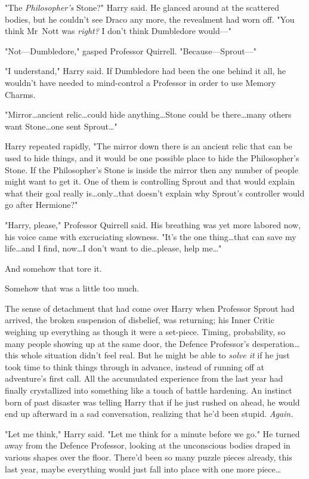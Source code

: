 "The \emph{Philosopher's} Stone?" Harry said. He glanced around at the
scattered bodies, but he couldn't see Draco any more, the revealment had worn
off. "You think Mr~Nott was \emph{right?} I don't think Dumbledore would—"

"Not—Dumbledore," gasped Professor Quirrell. "Because—Sprout—"

"I understand," Harry said. If Dumbledore had been the one behind it all, he
wouldn't have needed to mind-control a Professor in order to use Memory Charms.

"Mirror…ancient relic…could hide anything…Stone could
be there…many others want Stone…one sent Sprout…"

Harry repeated rapidly, "The mirror down there is an ancient relic that can be
used to hide things, and it would be one possible place to hide the
Philosopher's Stone. If the Philosopher's Stone is inside the mirror then any
number of people might want to get it. One of them is controlling Sprout and
that would explain what their goal really is…only…that doesn't
explain why Sprout's controller would go after Hermione?"

"Harry, please," Professor Quirrell said. His breathing was yet more labored
now, his voice came with excruciating slowness. "It's the one thing…that
can save my life…and I find, now…I don't want to die…please, help me…"

And somehow that tore it.

Somehow that was a little too much.

The sense of detachment that had come over Harry when Professor Sprout had
arrived, the broken suspension of disbelief, was returning; his Inner Critic
weighing up everything as though it were a set-piece. Timing, probability, so
many people showing up at the same door, the Defence Professor's
desperation…this whole situation didn't feel real. But he might be able
to \emph{solve it} if he just took time to think things through in advance,
instead of running off at adventure's first call. All the accumulated
experience from the last year had finally crystallized into something like a
touch of battle hardening. An instinct born of past disaster was telling Harry
that if he just rushed on ahead, he would end up afterward in a sad
conversation, realizing that he'd been stupid. \emph{Again.}

"Let me think," Harry said. "Let me think for a minute before we go." He turned
away from the Defence Professor, looking at the unconscious bodies draped in
various shapes over the floor. There'd been so many puzzle pieces already, this
last year, maybe everything would just fall into place with one more
piece…

